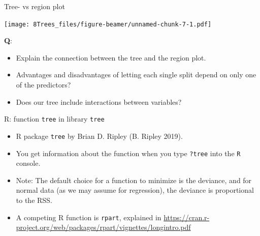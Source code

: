 \documentclass[10pt,ignorenonframetext,]{beamer}
\providecommand{\tightlist}{%
  \setlength{\itemsep}{0pt}\setlength{\parskip}{0pt}}
\begin{document}
\begin{frame}

\begin{block}{Tree- vs region plot}

\vspace{2mm}

\texttt{[image: 8Trees\_files/figure-beamer/unnamed-chunk-7-1.pdf]}

\vspace{-2mm} \textbf{Q}:

\begin{itemize}
\tightlist
\item
  Explain the connection between the tree and the region plot.
\item
  Advantages and disadvantages of letting each single split depend on
  only one of the predictors?
\item
  Does our tree include interactions between variables?
\end{itemize}

\end{block}

\end{frame}

\begin{frame}[fragile]

\begin{block}{R: function \texttt{tree} in library \texttt{tree}}

\vspace{2mm}

\begin{itemize}
\item
  R package \texttt{tree} by Brian D. Ripley (B. Ripley 2019).
\item
  You get information about the function when you type \texttt{?tree}
  into the \texttt{R} console.
\item
  Note: The default choice for a function to minimize is the deviance,
  and for normal data (as we may assume for regression), the deviance is
  proportional to the RSS.
\end{itemize}

\begin{itemize}
\tightlist
\item
  A competing R function is \texttt{rpart}, explained in
  \url{https://cran.r-project.org/web/packages/rpart/vignettes/longintro.pdf}
\end{itemize}

\end{block}

\end{frame}
\end{document}
